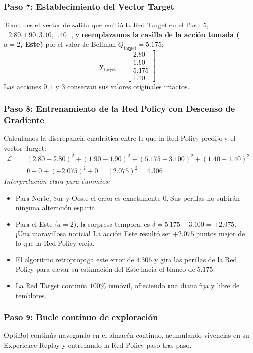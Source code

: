 \begin{calculomanual}
\subsubsection*{Paso 7: Establecimiento del Vector Target}
Tomamos el vector de salida que emitió la Red Target en el Paso~5, $[2.80, 1.90, 3.10, 1.40]$, y \textbf{reemplazamos la casilla de la acción tomada ($a=2$, Este)} por el valor de Bellman $Q_{\text{target}} = 5.175$:
\[
  \mathbf{y}_{\text{target}} = \begin{bmatrix} 2.80 \\ 1.90 \\ \mathbf{5.175} \\ 1.40 \end{bmatrix}
\]
Las acciones $0, 1$ y $3$ conservan sus valores originales intactos.

\subsubsection*{Paso 8: Entrenamiento de la Red Policy con Descenso de Gradiente}
Calculamos la discrepancia cuadrática entre lo que la Red Policy predijo y el vector Target:
\begin{align*}
  \mathcal{L} &= (2.80 - 2.80)^2 + (1.90 - 1.90)^2 + (\mathbf{5.175} - \mathbf{3.100})^2 + (1.40 - 1.40)^2 \\
              &= 0 + 0 + (+2.075)^2 + 0 = (2.075)^2 = \mathbf{4.306}
\end{align*}
\textit{Interpretación clara para dummies:}
\begin{itemize}
  \item Para Norte, Sur y Oeste el error es exactamente $0$. Sus perillas no sufrirán ninguna alteración espuria.
  \item Para el Este ($a=2$), la sorpresa temporal es $\delta = 5.175 - 3.100 = \mathbf{+2.075}$. ¡Una maravillosa noticia! La acción Este resultó ser $+2.075$ puntos mejor de lo que la Red Policy creía.
  \item El algoritmo retropropaga este error de $4.306$ y gira las perillas de la Red Policy para elevar su estimación del Este hacia el blanco de $5.175$.
  \item La Red Target continúa $100\%$ inmóvil, ofreciendo una diana fija y libre de temblores.
\end{itemize}

\subsubsection*{Paso 9: Bucle continuo de exploración}
OptiBot continúa navegando en el almacén continuo, acumulando vivencias en su Experience Replay y entrenando la Red Policy paso tras paso.


\end{calculomanual}
